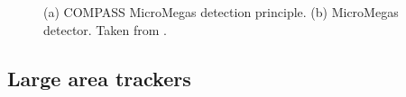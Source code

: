 \begin{figure}[!h]
  \centering
	\caption{(a) COMPASS MicroMegas detection principle. (b) MicroMegas detector. Taken from \cite{NIM}.}
	\label{pic:MM}
\end{figure}

\subsection{Large area trackers}

